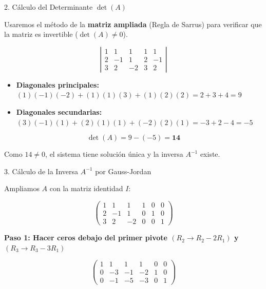\documentclass[10pt, aspectratio=169]{beamer}
\begin{document}
	\begin{frame}{2. Cálculo del Determinante $\det(A)$}
		
		
	Usaremos el método de la \textbf{matriz ampliada} (Regla de Sarrus) para verificar que la matriz es
	invertible ($\det(A) \neq 0$).
	
	\bigskip
	
	\[
	\left|
	\begin{array}{ccc|cc}
		1 &  1 &  1 & 1 &  1 \\
		2 & -1 &  1 & 2 & -1 \\
		3 &  2 & -2 & 3 &  2
	\end{array}
	\right|
	\]
	
	\bigskip
	
	\begin{itemize}
		\item \textbf{Diagonales principales:}
		$(1)(-1)(-2) + (1)(1)(3) + (1)(2)(2) = 2 + 3 + 4 = 9$
		
		\item \textbf{Diagonales secundarias:}
		$(3)(-1)(1) + (2)(1)(1) + (-2)(2)(1) = -3 + 2 - 4 = -5$
	\end{itemize}
	
	\bigskip
	
	\[
	\det(A) = 9 - (-5) = \mathbf{14}
	\]
	
	\bigskip
	
	\noindent Como $14 \neq 0$, el sistema tiene solución única y la inversa $A^{-1}$ existe.
	\end{frame}
	\begin{frame}{3. Cálculo de la Inversa $A^{-1}$ por Gauss-Jordan}
		
			Ampliamos $A$ con la matriz identidad $I$:
		
		\bigskip
		
		\[
		\left(
		\begin{array}{ccc|ccc}
			1 &  1 &  1 & 1 & 0 & 0 \\
			2 & -1 &  1 & 0 & 1 & 0 \\
			3 &  2 & -2 & 0 & 0 & 1
		\end{array}
		\right)
		\]
		
		\bigskip
		
		\noindent \textbf{Paso 1: Hacer ceros debajo del primer pivote
			$(R_2 \rightarrow R_2 - 2R_1)$ y $(R_3 \rightarrow R_3 - 3R_1)$}
		
		\bigskip
		
		\[
		\left(
		\begin{array}{ccc|ccc}
			1 &  1 &  1 &  1 & 0 & 0 \\
			0 & -3 & -1 & -2 & 1 & 0 \\
			0 & -1 & -5 & -3 & 0 & 1
		\end{array}
		\right)
		\]
		\end{frame}
\end{document}

